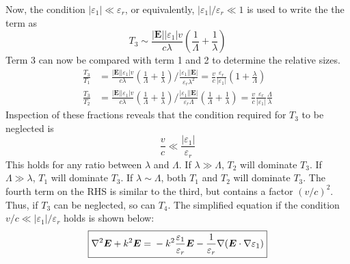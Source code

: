 \documentclass[10pt,a4paper,draft]{scrartcl}
\begin{document}
	Now, the condition $|\varepsilon_1| \ll \varepsilon_r$, or equivalently, $|\varepsilon_1|/\varepsilon_r \ll 1$ is used to write the the term as
	\begin{equation*}
		T_3 \sim \frac{|\bm{E}| |\varepsilon_1| v}{c\lambda} \left( \frac{1}{\Lambda} + \frac{1}{\lambda} \right)
	\end{equation*}
	Term 3 can now be compared with term 1 and 2 to determine the relative sizes.
	\begin{align*}
		\frac{T_3}{T_1} &= \frac{|\bm{E}| |\varepsilon_1| v}{c\lambda} \left( \frac{1}{\Lambda} + \frac{1}{\lambda} \right)
		\bigg/
		\frac{|\varepsilon_1| |\bm{E}|}{\varepsilon_r \lambda^2} =
		\frac{v}{c} \frac{\varepsilon_r}{|\varepsilon_1|} \left( 1 + \frac{\lambda}{\Lambda} \right) \\
		\frac{T_3}{T_2} &= \frac{|\bm{E}| |\varepsilon_1| v}{c\lambda} \left( \frac{1}{\Lambda} + \frac{1}{\lambda} \right)
		\bigg/
		\frac{|\varepsilon_1| |\bm{E}|}{\varepsilon_r \Lambda} \left( \frac{1}{\Lambda} + \frac{1}{\lambda} \right) =
		\frac{v}{c} \frac{\varepsilon_r}{|\varepsilon_1|} \frac{\Lambda}{\lambda}
	\end{align*}
	Inspection of these fractions reveals that the condition required for $T_3$ to be neglected is
	\begin{equation*}
		\frac{v}{c} \ll \frac{|\varepsilon_1|}{\varepsilon_r}
	\end{equation*}
	This holds for any ratio between $\lambda$ and $\Lambda$. If $\lambda \gg \Lambda$, $T_2$ will dominate $T_3$. If $\Lambda \gg \lambda$, $T_1$ will dominate $T_3$. If $\lambda \sim \Lambda$, both $T_1$ and $T_2$ will dominate $T_3$. The fourth term on the RHS is similar to the third, but contains a factor $(v/c)^2$. Thus, if $T_3$ can be neglected, so can $T_4$.	The simplified equation if the condition $v/c \ll |\varepsilon_1|/\varepsilon_r$ holds is shown below:
	\begin{equation*}
	\boxed{
		\nabla^2\bm{E} + k^2 \bm{E} = \\
		-k^2 \frac{\varepsilon_1}{\varepsilon_r} \bm{E} -\frac{1}{\varepsilon_r}\nabla(\bm{E} \cdot \nabla \varepsilon_1)
	}
	\end{equation*}
	
\end{document}
